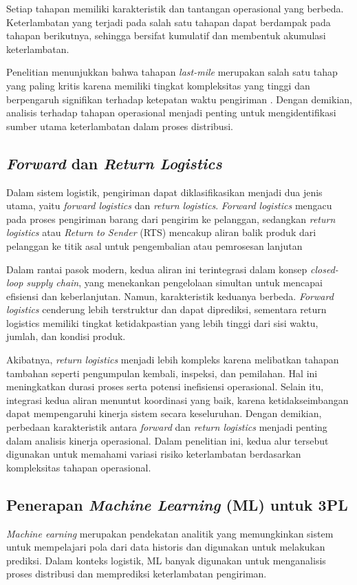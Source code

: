 Setiap tahapan memiliki karakteristik dan tantangan operasional yang berbeda. Keterlambatan yang terjadi pada salah satu tahapan dapat berdampak pada tahapan berikutnya, sehingga bersifat kumulatif dan membentuk akumulasi keterlambatan.

Penelitian menunjukkan bahwa tahapan \textit{last-mile} merupakan salah satu tahap yang paling kritis karena memiliki tingkat kompleksitas yang tinggi dan berpengaruh signifikan terhadap ketepatan waktu pengiriman \citep{article:boysen2021}. Dengan demikian, analisis terhadap tahapan operasional menjadi penting untuk mengidentifikasi sumber utama keterlambatan dalam proses distribusi.

\subsection{\textit{Forward} dan \textit{Return Logistics}}
Dalam sistem logistik, pengiriman dapat diklasifikasikan menjadi dua jenis utama, yaitu \textit{forward logistics} dan \textit{return logistics}. \textit{Forward logistics} mengacu pada proses pengiriman barang dari pengirim ke pelanggan, sedangkan \textit{return logistics }atau \textit{Return to Sender} (RTS) mencakup aliran balik produk dari pelanggan ke titik asal untuk pengembalian atau pemrosesan lanjutan \citep{article:prajapati2022}

Dalam rantai pasok modern, kedua aliran ini terintegrasi dalam konsep \textit{closed-loop supply chain}, yang menekankan pengelolaan simultan untuk mencapai efisiensi dan keberlanjutan. Namun, karakteristik keduanya berbeda. \textit{Forward logistics} cenderung lebih terstruktur dan dapat diprediksi, sementara return logistics memiliki tingkat ketidakpastian yang lebih tinggi dari sisi waktu, jumlah, dan kondisi produk. 

Akibatnya, \textit{return logistics} menjadi lebih kompleks karena melibatkan tahapan tambahan seperti pengumpulan kembali, inspeksi, dan pemilahan. Hal ini meningkatkan durasi proses serta potensi inefisiensi operasional. Selain itu, integrasi kedua aliran menuntut koordinasi yang baik, karena ketidakseimbangan dapat mempengaruhi kinerja sistem secara keseluruhan. Dengan demikian, perbedaan karakteristik antara \textit{forward} dan \textit{return logistics} menjadi penting dalam analisis kinerja operasional. Dalam penelitian ini, kedua alur tersebut digunakan untuk memahami variasi risiko keterlambatan berdasarkan kompleksitas tahapan operasional.

\subsection{Penerapan \textit{Machine Learning} (ML) untuk 3PL}
\textit{Machine earning} merupakan pendekatan analitik yang memungkinkan sistem untuk mempelajari pola dari data historis dan digunakan untuk melakukan prediksi. Dalam konteks logistik, ML banyak digunakan untuk menganalisis proses distribusi dan memprediksi keterlambatan pengiriman.

